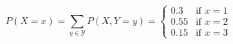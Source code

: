 \[
P(X=x) = \sum_{y \in \mathcal{Y}}^{} P(X, Y=y) = 
    \begin{cases}
        0.3 &\text{if } x=1 \\
        0.55 &\text{if } x=2 \\
        0.15 &\text{if } x=3
    \end{cases}
\]